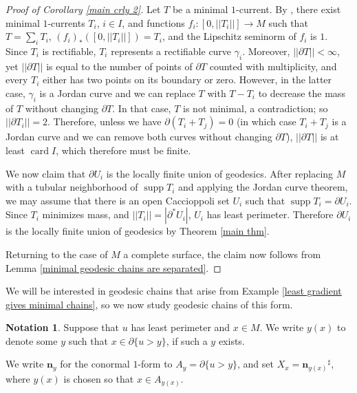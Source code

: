 \documentclass[reqno,12pt,letterpaper]{amsart}
\DeclareMathOperator{\card}{card}
\DeclareMathOperator{\supp}{supp}
\newcommand{\normal}{\mathbf n}
\theoremstyle{definition}
\newtheorem{notation}[theorem]{Notation}
\numberwithin{equation}{section}
\begin{document}
\begin{proof}[Proof of Corollary \ref{main crly 2}]
Let $T$ be a minimal $1$-current.
By \cite[\S4.2.25]{federer2014geometric}, there exist minimal $1$-currents $T_i$, $i \in I$,
and functions $f_i: [0, ||T_i||] \to M$ such that $T = \sum_i T_i$, $(f_i)_*([0, ||T_i||]) = T_i$, and the Lipschitz seminorm of $f_i$ is $1$.
Since $T_i$ is rectifiable, $T_i$ represents a rectifiable curve $\gamma_i$.
Moreover, $||\partial T|| < \infty$, yet $||\partial T||$ is equal to the number of points of $\partial T$ counted with multiplicity, and every $T_i$ either has two points on its boundary or zero.
However, in the latter case, $\gamma_i$ is a Jordan curve and we can replace $T$ with $T - T_i$ to decrease the mass of $T$ without changing $\partial T$.
In that case, $T$ is not minimal, a contradiction; so $||\partial T_i|| = 2$.
Therefore, unless we have $\partial(T_i + T_j) = 0$ (in which case $T_i + T_j$ is a Jordan curve and we can remove both curves without changing $\partial T$), $||\partial T||$ is at least $\card I$, which therefore must be finite.

We now claim that $\partial U_i$ is the locally finite union of geodesics.
After replacing $M$ with a tubular neighborhood of $\supp T_i$ and applying the Jordan curve theorem, we may assume that there is an open Caccioppoli set $U_i$ such that $\supp T_i = \partial U_i$.
Since $T_i$ minimizes mass, and $||T_i|| = |\partial^* U_i|$, $U_i$ has least perimeter.
Therefore $\partial U_i$ is the locally finite union of geodesics by Theorem \ref{main thm}.

Returning to the case of $M$ a complete surface, the claim now follows from Lemma \ref{minimal geodesic chains are separated}.
\end{proof}

We will be interested in geodesic chains that arise from Example \ref{least gradient gives minimal chains}, so we now study geodesic chains of this form.


\begin{notation}
Suppose that $u$ has least perimeter and $x \in M$.
We write $y(x)$ to denote some $y$ such that $x \in \partial \{u > y\}$, if such a $y$ exists.
\end{notation}
We write $\normal_y$ for the conormal $1$-form to $A_y = \partial \{u > y\}$, and set $X_x = {\normal_{y(x)}}^\sharp$, where $y(x)$ is chosen so that $x \in A_{y(x)}$.
\end{document}
